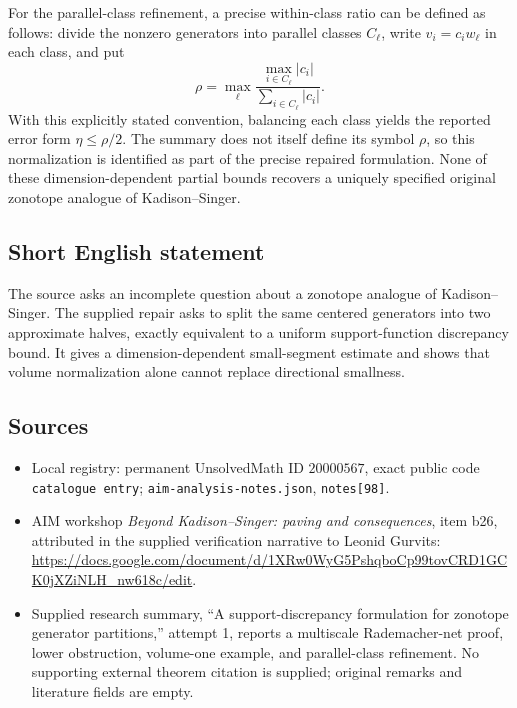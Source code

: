 \documentclass[11pt]{article}
\begin{document}
For the parallel-class refinement, a precise within-class ratio can be defined as follows: divide the nonzero generators into parallel classes \(C_\ell\), write \(v_i=c_iw_\ell\) in each class, and put
\[
 \rho=\max_\ell\frac{\max_{i\in C_\ell}|c_i|}{\sum_{i\in C_\ell}|c_i|}.
\]
With this explicitly stated convention, balancing each class yields the reported error form \(\eta\leq\rho/2\). The summary does not itself define its symbol \(\rho\), so this normalization is identified as part of the precise repaired formulation. None of these dimension-dependent partial bounds recovers a uniquely specified original zonotope analogue of Kadison--Singer.
\subsection{Short English statement}
The source asks an incomplete question about a zonotope analogue of Kadison--Singer. The supplied repair asks to split the same centered generators into two approximate halves, exactly equivalent to a uniform support-function discrepancy bound. It gives a dimension-dependent small-segment estimate and shows that volume normalization alone cannot replace directional smallness.
\subsection{Sources}
\begin{itemize}
\item Local registry: permanent UnsolvedMath ID \(20000567\), exact public code \texttt{catalogue entry}; \texttt{aim-analysis-notes.json}, \texttt{notes[98]}.
\item AIM workshop \emph{Beyond Kadison--Singer: paving and consequences}, item b26, attributed in the supplied verification narrative to Leonid Gurvits: \url{https://docs.google.com/document/d/1XRw0WyG5PshqboCp99tovCRD1GCK0jXZiNLH_nw618c/edit}.
\item Supplied research summary, ``A support-discrepancy formulation for zonotope generator partitions,'' attempt 1, reports a multiscale Rademacher-net proof, lower obstruction, volume-one example, and parallel-class refinement. No supporting external theorem citation is supplied; original remarks and literature fields are empty.
\end{itemize}
\end{document}
